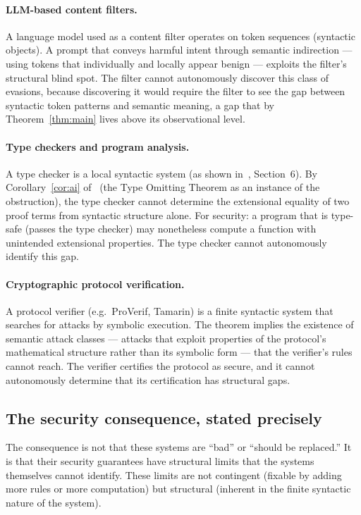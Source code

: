 \documentclass[11pt]{article}
\begin{document}
\paragraph{LLM-based content filters.}
A language model used as a content filter operates on token sequences
(syntactic objects). A prompt that conveys harmful intent through
semantic indirection --- using tokens that individually and locally
appear benign --- exploits the filter's structural blind spot. The
filter cannot autonomously discover this class of evasions, because
discovering it would require the filter to see the gap between
syntactic token patterns and semantic meaning, a gap that by
Theorem~\ref{thm:main} lives above its observational level.

\paragraph{Type checkers and program analysis.}
A type checker is a local syntactic system
(as shown in~\cite{buono2026obstruction}, Section~6). By
Corollary~\ref{cor:ai} of~\cite{buono2026obstruction} (the Type Omitting
Theorem as an instance of the obstruction), the type checker cannot
determine the extensional equality of two proof terms from syntactic
structure alone. For security: a program that is type-safe (passes the
type checker) may nonetheless compute a function with unintended
extensional properties. The type checker cannot autonomously identify
this gap.

\paragraph{Cryptographic protocol verification.}
A protocol verifier (e.g.\ ProVerif, Tamarin) is a finite syntactic
system that searches for attacks by symbolic execution. The theorem
implies the existence of semantic attack classes --- attacks that exploit
properties of the protocol's mathematical structure rather than its
symbolic form --- that the verifier's rules cannot reach. The verifier
certifies the protocol as secure, and it cannot autonomously determine
that its certification has structural gaps.

\subsection{The security consequence, stated precisely}

The consequence is not that these systems are ``bad'' or ``should be
replaced.'' It is that their security guarantees have structural limits
that the systems themselves cannot identify. These limits are not
contingent (fixable by adding more rules or more computation) but
structural (inherent in the finite syntactic nature of the system).
\end{document}
